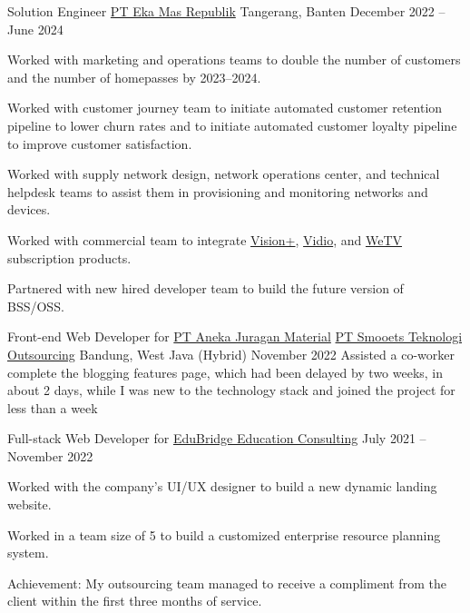 \begin{cventries}
\cventry
{Solution Engineer} %
{\href{https://myrepublic.co.id/}{PT Eka Mas Republik}} %
{Tangerang, Banten} %
{December 2022 -- June 2024} %
{ %
\begin{cvitems}
\item {Worked with marketing and operations teams to double the number of customers and the number of homepasses by 2023--2024.}
\item {Worked with customer journey team to initiate automated customer retention pipeline to lower churn rates and to initiate automated customer loyalty pipeline to improve customer satisfaction.}
\item {Worked with supply network design, network operations center, and technical helpdesk teams to assist them in provisioning and monitoring networks and devices.}
\item {Worked with commercial team to integrate \href{https://www.visionplus.id/}{Vision+}, \href{https://www.vidio.com/}{Vidio}, and \href{https://wetv.vip/}{WeTV} subscription products.}
\item {Partnered with new hired developer team to build the future version of BSS/OSS.}
\end{cvitems}
}


\cventry
{Front-end Web Developer for \href{https://juraganmaterial.id/}{PT Aneka Juragan Material}} %
{\href{https://www.smooets.com/}{PT Smooets Teknologi Outsourcing}} %
{Bandung, West Java (Hybrid)} %
{November 2022} %
{ %
Assisted a co-worker complete the blogging features page, which had been delayed by two weeks, in about 2 days, while I was new to the technology stack and joined the project for less than a week
}


\cventry
{Full-stack Web Developer for \href{https://www.edubridge.co.id/}{EduBridge Education Consulting}} %
{} %
{} %
{July 2021 -- November 2022} %
{ %
\begin{cvitems}
\item {Worked with the company's UI/UX designer to build a new dynamic landing website.}
\item {Worked in a team size of 5 to build a customized enterprise resource planning system.}
\end{cvitems}
\vspace{4mm}
Achievement: My outsourcing team managed to receive a compliment from the client within the first three months of service.
}


\end{cventries}

